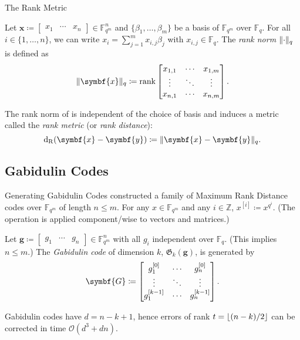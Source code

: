 \documentclass[usepdftitle=false]{beamer}
\renewcommand*{\vec}{\symbf}%
\newcommand*{\mat}{\symbf}%
\DeclareMathOperator{\rank}{rank}%
\newcommand*{\FF}{\ensuremath{\mathbb{F}}}%
\newcommand*{\ZZ}{\ensuremath{\mathbb{Z}}}%
\newcommand*{\BigOh}{\mathcal{O}}%
\newcommand*{\Gab}{\ensuremath{\mathfrak{G}}}%
\DeclarePairedDelimiter{\floor}{\lfloor}{\rfloor}%
\DeclarePairedDelimiter{\norm}{\lVert}{\rVert}%
\newcommand*{\normR}[2]{\ensuremath{\norm{#1}_{#2}}}%
\DeclareMathOperator{\dR}{d_R}%
\begin{document}
\begin{frame}{The Rank Metric}
  \begin{definition}
    Let
    \(\vec{x} \coloneqq \begin{bmatrix} x_1 & \cdots &
      x_n \end{bmatrix} \in \FF_{q^m}^n\) and
    \(\{\beta_1, \ldots, \beta_m\}\) be a basis of \(\FF_{q^m}\) over
    \(\FF_q\).  For all \(i \in \{1, \ldots, n\}\), we can write
    \(x_i = \sum_{j = 1}^m x_{i, j} \beta_j\) with
    \(x_{i, j} \in \FF_q\).  The \emph{rank norm} \(\normR{\cdot}{q}\)
    is defined as
    \begin{equation}\label{eq:rank-norm}
      \normR{\vec{x}}{q} \coloneqq \rank \begin{bmatrix}
        x_{1, 1} & \cdots & x_{1, m} \\
        \vdots & \ddots & \vdots \\
        x_{n, 1} & \cdots & x_{n, m}
      \end{bmatrix}\text.
    \end{equation}
  \end{definition}
  The rank norm of is independent of the choice of basis and induces a
  metric called the \emph{rank metric} (or \emph{rank distance}):
  \[\dR(\vec{x} - \vec{y}) \coloneqq \normR{\vec{x} -
      \vec{y}}{q}\text.\]
\end{frame}

\subsection{Gabidulin Codes}

\begin{frame}{Generating Gabidulin Codes}
  \Textcite{Gab85} constructed a family of Maximum Rank Distance codes
  over \(\FF_{q^m}\) of length \(n \le m\).  For any
  \(x \in \FF_{q^m}\) and any \(i \in \ZZ\),
  \(x^{[i]} \coloneqq x^{q^i}\).  (The operation is applied
  component\-/wise to vectors and matrices.)
  \begin{definition}
    Let
    \(\vec{g} \coloneqq \begin{bmatrix} g_1 & \cdots &
      g_n \end{bmatrix} \in \FF_{q^m}^n\) with all \(g_i\) independent
    over \(\FF_q\).  (This implies \(n \le m\).)  The \emph{Gabidulin
      code} of dimension \(k\), \(\Gab_k(\vec{g})\), is generated by
    \begin{equation}\label{eq:gabidulin-code-generator}
      \mat{G} \coloneqq
      \begin{bmatrix}
        g_1^{[0]} & \cdots & g_n^{[0]} \\
        \vdots & \ddots & \vdots \\
        g_1^{[k - 1]} & \cdots & g_n^{[k - 1]}
      \end{bmatrix}\text.
    \end{equation}
  \end{definition}
  Gabidulin codes have \(d = n - k + 1\), hence errors of rank
  \(t = \floor{(n - k) / {2}}\) can be corrected in time
  \(\BigOh(d^3 + d n)\).
\end{frame}
\end{document}
